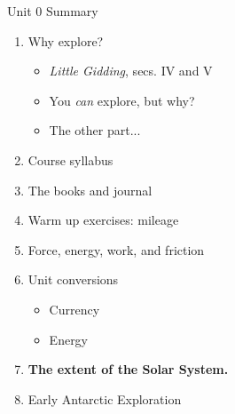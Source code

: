 \documentclass{beamer}
\begin{document}
\begin{frame}{Unit 0 Summary}
\begin{enumerate}
\item Why explore?
\begin{itemize}
\item \textit{Little Gidding}, secs. IV and V
\item You \textit{can} explore, but why?
\item The other part...
\end{itemize}
\item Course syllabus
\item The books and journal
\item Warm up exercises: mileage
\item Force, energy, work, and friction
\item Unit conversions
\begin{itemize}
\item Currency
\item Energy
\end{itemize}
\item \textbf{The extent of the Solar System.}
\item Early Antarctic Exploration
\end{enumerate}
\end{frame}
\end{document}
